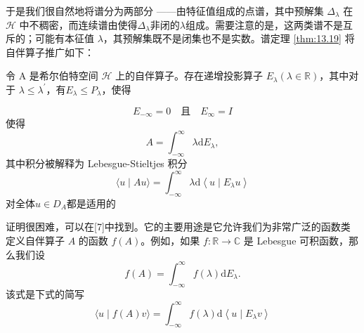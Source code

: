 于是我们很自然地将谱分为两部分 ——由特征值组成的点谱，其中预解集 \(\Delta_{\lambda}\) 在 \(\mathcal{H}\) 中不稠密，而连续谱由使得\(\Delta_{\lambda}\)非闭的\(\lambda\)组成。需要注意的是，这两类谱不是互斥的；可能有本征值 \(\lambda\)，其预解集既不是闭集也不是实数。谱定理 \ref{thm:13.19} 将自伴算子推广如下： 
\begin{theorem}\label{thm:13.25}
    令 A 是希尔伯特空间 \(\mathcal{H}\) 上的自伴算子。存在递增投影算子 \(E_{\lambda}(\lambda \in \mathbb{R})\)，其中对于 \( \lambda \leq \lambda^{\prime}\)，有\(E_{\lambda} \leq P_{\lambda}\)，使得

\[
E_{-\infty}=0 \quad \text {且} \quad E_{\infty}=I
\]
使得
\[
A=\int_{-\infty}^{\infty} \lambda \mathrm{d} E_{\lambda},
\]
其中积分被解释为 Lebesgue-Stieltjes 积分
\[
\langle u \mid A u\rangle=\int_{-\infty}^{\infty} \lambda \mathrm{d}\left\langle u \mid E_{\lambda} u\right\rangle
\]
对全体\(u \in D_{A}\)都是适用的
\end{theorem} 
证明很困难，可以在[7]中找到。它的主要用途是它允许我们为非常广泛的函数类定义自伴算子 \(A\) 的函数 \(f(A)\)。例如，如果 \(f: \mathbb{R} \rightarrow \mathbb{C}\) 是 Lebesgue 可积函数，那么我们设
\[
f(A)=\int_{-\infty}^{\infty} f(\lambda) \mathrm{d} E_{\lambda} .
\]
该式是下式的简写
\[
\langle u \mid f(A) v\rangle=\int_{-\infty}^{\infty} f(\lambda) \mathrm{d}\left\langle u \mid E_{\lambda} v\right\rangle
\]
